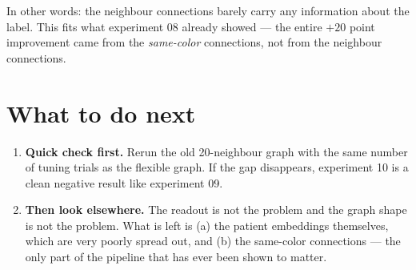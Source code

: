 \documentclass[11pt]{article}
\begin{document}
In other words: the neighbour connections barely carry any information about the label. This fits what
experiment 08 already showed --- the entire $+20$ point improvement came from the \emph{same-color}
connections, not from the neighbour connections.

\section*{What to do next}

\begin{enumerate}
  \item \textbf{Quick check first.} Rerun the old 20-neighbour graph with the same number of tuning
        trials as the flexible graph. If the gap disappears, experiment 10 is a clean negative result
        like experiment 09.
  \item \textbf{Then look elsewhere.} The readout is not the problem and the graph shape is not the
        problem. What is left is (a) the patient embeddings themselves, which are very poorly spread
        out, and (b) the same-color connections --- the only part of the pipeline that has ever been
        shown to matter.
\end{enumerate}
\end{document}
